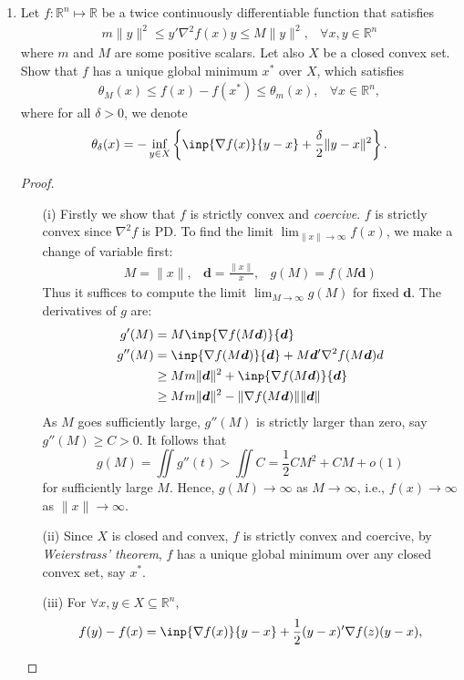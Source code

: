 \begin{enumerate}
\begin{proof}
\end{proof}
\item
Let $f:\mathbb{R}^n\mapsto\mathbb{R}$ be a twice continuously differentiable function that satisfies
\[
\begin{array}{ll}
m\|y\|^2\le y'\nabla^2f(x)y\le M\|y\|^2,
&
\forall x,y\in\mathbb{R}^n
\end{array}
\]
where $m$ and $M$ are some positive scalars. Let also $X$ be a closed convex set. Show that $f$ has a unique global minimum $x^*$ over $X$, which satisfies
\[
\begin{array}{ll}
\theta_M(x)\le f(x) - f(x^*)\le\theta_m(x),
&
\forall x\in\mathbb{R}^n,
\end{array}
\]
where for all $\delta>0$, we denote
\[
\theta_\delta(x)=-\inf_{y\in X}\left\{\inp{\nabla f(x)}{y-x}+\frac{\delta}{2}\|y-x\|^2\right\}.
\]
\begin{proof}
\begin{enumerate}
\item[(i)]
Firstly we show that $f$ is strictly convex and \emph{coercive}. $f$ is strictly convex since $\nabla^2f$ is PD. To find the limit $\lim_{\|x\|\to\infty}f(x)$, we make a change of variable first:
\[
\begin{array}{lll}
M=\|x\|,&\bm d=\frac{\|x\|}{x},&g(M)=f(M\bm d)
\end{array}
\]
Thus it suffices to compute the limit $\lim_{M\to\infty}g(M)$ for fixed $\bm d$. The derivatives of $g$ are:
\begin{align*}
g'(M)&=M\inp{\nabla f(M\bm d)}{\bm d}\\
g''(M)&=\inp{\nabla f(M\bm d)}{\bm d}+M\bm d'\nabla^2 f(M\bm d)d\\&\ge Mm\|\bm d\|^2+\inp{\nabla f(M\bm d)}{\bm d}\\
&\ge Mm\|\bm d\|^2-\|\nabla f(M\bm d)\|\|\bm d\|
\end{align*}
As $M$ goes sufficiently large, $g''(M)$ is strictly larger than zero, say $g''(M)\ge C>0$. It follows that
\[
g(M)=\iint g''(t)> \iint C=\frac{1}{2}CM^2+CM+o(1)
\]
for sufficiently large $M$. Hence, $g(M)\to\infty$ as $M\to\infty$, i.e., $f(x)\to\infty$ as $\|x\|\to\infty$.
\item[(ii)]
Since $X$ is closed and convex, $f$ is strictly convex and coercive, by \emph{Weierstrass’ theorem}, $f$ has a  
unique global minimum over any closed convex set, say $x^*$.
\item[(iii)]
For $\forall x,y\in X\subseteq\mathbb{R}^n$,
\[
f(y)-f(x)=\inp{\nabla f(x)}{y-x}+\frac{1}{2}(y-x)'\nabla f(z)(y-x),
\]
\end{enumerate}
\end{proof}
\end{enumerate}
